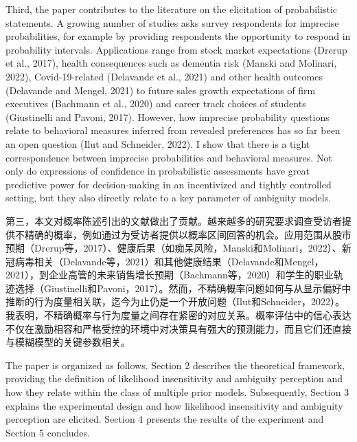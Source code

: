 \documentclass[12pt,a4paper]{article}
\newenvironment{original}
  {\par\medskip\noindent\color{black}\ignorespaces}
  {\par\medskip}
\newenvironment{translation}
  {\par\noindent\color{transblue}\ignorespaces}
  {\par\medskip\medskip}
\begin{document}
\begin{original}
Third, the paper contributes to the literature on the elicitation of probabilistic statements. A growing number of studies asks survey respondents for imprecise probabilities, for example by providing respondents the opportunity to respond in probability intervals. Applications range from stock market expectations (Drerup et al., 2017), health consequences such as dementia risk (Manski and Molinari, 2022), Covid-19-related (Delavande et al., 2021) and other health outcomes (Delavande and Mengel, 2021) to future sales growth expectations of firm executives (Bachmann et al., 2020) and career track choices of students (Giustinelli and Pavoni, 2017). However, how imprecise probability questions relate to behavioral measures inferred from revealed preferences has so far been an open question (Ilut and Schneider, 2022). I show that there is a tight correspondence between imprecise probabilities and behavioral measures. Not only do expressions of confidence in probabilistic assessments have great predictive power for decision-making in an incentivized and tightly controlled setting, but they also directly relate to a key parameter of ambiguity models.
\end{original}

\begin{translation}
第三，本文对概率陈述引出的文献做出了贡献。越来越多的研究要求调查受访者提供不精确的概率，例如通过为受访者提供以概率区间回答的机会。应用范围从股市预期（Drerup等，2017）、健康后果（如痴呆风险，Manski和Molinari，2022）、新冠病毒相关（Delavande等，2021）和其他健康结果（Delavande和Mengel，2021），到企业高管的未来销售增长预期（Bachmann等，2020）和学生的职业轨迹选择（Giustinelli和Pavoni，2017）。然而，不精确概率问题如何与从显示偏好中推断的行为度量相关联，迄今为止仍是一个开放问题（Ilut和Schneider，2022）。我表明，不精确概率与行为度量之间存在紧密的对应关系。概率评估中的信心表达不仅在激励相容和严格受控的环境中对决策具有强大的预测能力，而且它们还直接与模糊模型的关键参数相关。
\end{translation}

\begin{original}
The paper is organized as follows. Section 2 describes the theoretical framework, providing the definition of likelihood insensitivity and ambiguity perception and how they relate within the class of multiple prior models. Subsequently, Section 3 explains the experimental design and how likelihood insensitivity and ambiguity perception are elicited. Section 4 presents the results of the experiment and Section 5 concludes.
\end{original}
\end{document}
